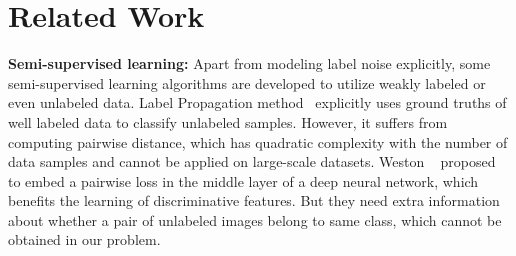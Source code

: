 \documentclass[10pt,twocolumn,letterpaper]{article}
\begin{document}



\section{Related Work} %
\label{sec:related_work}

\noindent
\textbf{Semi-supervised learning:} Apart from modeling label noise explicitly, some semi-supervised learning algorithms are developed to utilize weakly labeled or even unlabeled data. Label Propagation method~\cite{zhu2002learning} explicitly uses ground truths of well labeled data to classify unlabeled samples. However, it suffers from computing pairwise distance, which has quadratic complexity with the number of data samples and cannot be applied on large-scale datasets. Weston \etal~\cite{weston2012deep} proposed to embed a pairwise loss in the middle layer of a deep neural network, which benefits the learning of discriminative features. But they need extra information about whether a pair of unlabeled images belong to same class, which cannot be obtained in our problem.
\end{document}
